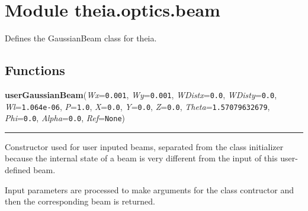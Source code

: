 %
%
%


\section{Module theia.optics.beam}

    \label{theia:optics:beam}
Defines the GaussianBeam class for theia.



  \subsection{Functions}

    \label{theia:optics:beam:userGaussianBeam}

    \vspace{0.5ex}

\hspace{.8\funcindent}\begin{boxedminipage}{\funcwidth}

    \raggedright \textbf{userGaussianBeam}(\textit{Wx}={\tt 0.001}, \textit{Wy}={\tt 0.001}, \textit{WDistx}={\tt 0.0}, \textit{WDisty}={\tt 0.0}, \textit{Wl}={\tt 1.064e-06}, \textit{P}={\tt 1.0}, \textit{X}={\tt 0.0}, \textit{Y}={\tt 0.0}, \textit{Z}={\tt 0.0}, \textit{Theta}={\tt 1.57079632679}, \textit{Phi}={\tt 0.0}, \textit{Alpha}={\tt 0.0}, \textit{Ref}={\tt None})

    \vspace{-1.5ex}

    \rule{\textwidth}{0.5\fboxrule}
\setlength{\parskip}{2ex}
    Constructor used for user inputed beams, separated from the class 
    initializer because the internal state of a beam is very different from
    the input of this user-defined beam.

    Input parameters are processed to make arguments for the class 
    contructor and then the corresponding beam is returned.

\setlength{\parskip}{1ex}
    \end{boxedminipage}


